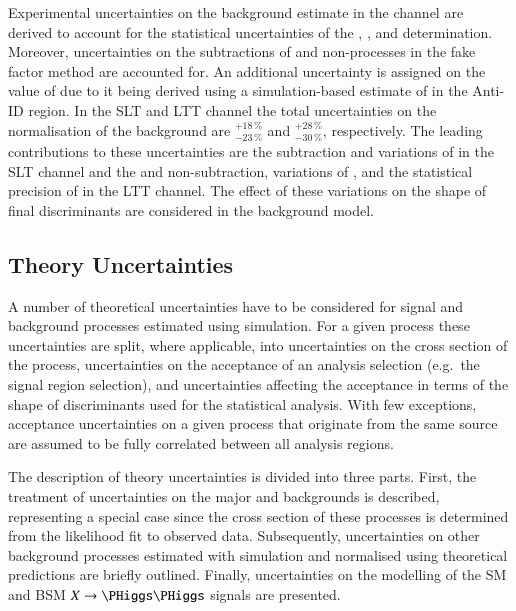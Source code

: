 Experimental uncertainties on the \faketauhadvis background estimate
in the \lephad channel are derived to account for the statistical
uncertainties of the \FFqcd, \FFttbar, and \rqcd
determination. Moreover, uncertainties on the subtractions of \ttbar
and non-\ttbar processes in the fake factor method are accounted
for. An additional uncertainty is assigned on the value of \rqcd due
to it being derived using a simulation-based estimate of \ttbarFakes
in the Anti-ID region. In the \lephad SLT and LTT channel the total
uncertainties on the normalisation of the \faketauhadvis background
are $^{+18\,\%}_{-23\,\%}$ and $^{+28\,\%}_{-30\,\%}$,
respectively. The leading contributions to these uncertainties are the
\ttbar subtraction and variations of \rqcd in the SLT channel and the
\ttbar and non-\ttbar subtraction, variations of \rqcd, and the
statistical precision of \FFttbar in the LTT channel. The effect of
these variations on the shape of final discriminants are considered in
the background model.


\subsection{Theory Uncertainties}%
\label{sec:modelling_uncertainties}%
\label{sec:theory_uncertainties}

A number of theoretical uncertainties have to be considered for signal
and background processes estimated using simulation. For a given
process these uncertainties are split, where applicable, into
uncertainties on the cross section of the process, uncertainties on
the acceptance of an analysis selection (e.g.\ the signal region
selection), and uncertainties affecting the acceptance in terms of the
shape of discriminants used for the statistical analysis. With few
exceptions, acceptance uncertainties on a given process that originate
from the same source are assumed to be fully correlated between all
analysis regions.

The description of theory uncertainties is divided into three parts.
First, the treatment of uncertainties on the major \ZHF and \ttbar
backgrounds is described, representing a special case since the cross
section of these processes is determined from the likelihood fit to
observed data. Subsequently, uncertainties on other background
processes estimated with simulation and normalised using theoretical
predictions are briefly outlined. Finally, uncertainties on the
modelling of the SM \HH and BSM $X \to \HH$ signals are presented.

